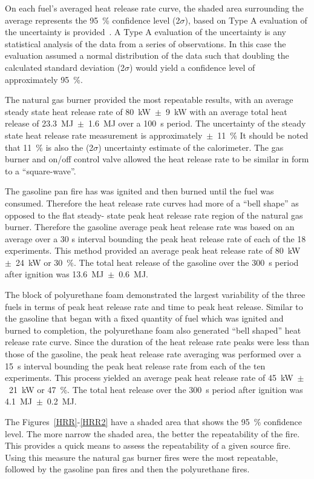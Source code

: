\documentclass[twoside]{uocthesis}
\begin{document}
{On each fuel’s averaged heat release rate curve, the shaded area surrounding the average represents the 95~\% confidence level (2$\sigma$), based on Type A evaluation of the uncertainty is provided~\cite{Taylor:1994}.  A Type A evaluation of the uncertainty is any statistical analysis of the data from a series of observations.  In this case the evaluation assumed a normal distribution of the data such that doubling the calculated standard deviation (2$\sigma$) would yield a confidence level of approximately 95~\%.

The natural gas burner provided the most repeatable results, with an average steady state heat release rate of 80~kW~$\pm$~9~kW with an average total heat release of 23.3~MJ~$\pm$~1.6~MJ over a 100~s period. The uncertainty of the steady state heat release rate measurement is approximately~$\pm$~11~\% It should be noted that 11~\% is also the (2$\sigma$) uncertainty estimate of the calorimeter. The gas burner and on/off control valve allowed the heat release rate to be similar in form to a ``square-wave''. 

The gasoline pan fire has was ignited and then burned until the fuel was consumed.  Therefore the heat release rate curves had more of a ``bell shape''  as opposed to the flat steady- state peak heat release rate region of the natural gas burner.  Therefore the  gasoline average peak heat release rate was based on an average over a 30 s interval bounding the peak heat release rate of each of the 18 experiments.  This method provided an average peak heat release rate of 80~kW~$\pm$~24~kW or 30~\%.  The total heat release of the gasoline over the 300~s period after ignition was 13.6~MJ~$\pm$~0.6~MJ.  

The block of polyurethane foam demonstrated the largest variability of the three fuels in terms of peak heat release rate and time to peak heat release. Similar to the gasoline that began with a fixed quantity of fuel which was ignited and burned to completion, the polyurethane foam also generated ``bell shaped'' heat release rate curve.  Since the duration of the heat release rate peaks were less than those of the gasoline, the peak heat release rate averaging was performed over a 15~s interval bounding the peak heat release rate from each of the ten experiments.  This process yielded an average peak heat release rate of 45~kW~$\pm$~21~kW or 47~\%.  The total heat release over the 300~s period after ignition was 4.1~MJ~$\pm$~0.2~MJ. 

The Figures~\ref{HRR}-\ref{HRR2} have a shaded area that shows the 95~\% confidence level.  The more narrow the shaded area, the better the repeatability of the fire.  This provides a quick means to assess the repeatability of a given source fire.  Using this measure the natural gas burner fires were the most repeatable, followed by the gasoline pan fires and then the polyurethane fires.       


}
\end{document}
